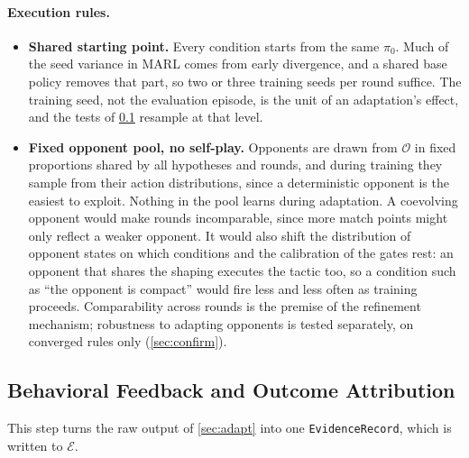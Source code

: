\documentclass[11pt]{article}
\newcommand{\Est}{\mathcal{E}}           %
\newcommand{\opp}{\mathcal{O}}           %
\newcommand{\code}[1]{\texttt{\small #1}}
\begin{document}
\paragraph{Execution rules.}
\begin{itemize}[leftmargin=*,itemsep=2pt]
  \item \textbf{Shared starting point.} Every condition starts from the same $\pi_0$.
    Much of the seed variance in MARL comes from early divergence, and a shared base policy removes that part, so two or three training seeds per round suffice.
    The training seed, not the evaluation episode, is the unit of an adaptation's effect, and the tests of \cref{sec:feedback} resample at that level.
  \item \textbf{Fixed opponent pool, no self-play.} Opponents are drawn from $\opp$ in fixed proportions shared by all hypotheses and rounds, and during training they sample from their action distributions, since a deterministic opponent is the easiest to exploit.
    Nothing in the pool learns during adaptation.
    A coevolving opponent would make rounds incomparable, since more match points might only reflect a weaker opponent.
    It would also shift the distribution of opponent states on which conditions and the calibration of the gates rest: an opponent that shares the shaping executes the tactic too, so a condition such as ``the opponent is compact'' would fire less and less often as training proceeds.
    Comparability across rounds is the premise of the refinement mechanism; robustness to adapting opponents is tested separately, on converged rules only (\cref{sec:confirm}).
\end{itemize}

\subsection{Behavioral Feedback and Outcome Attribution}
\label{sec:feedback}

This step turns the raw output of \cref{sec:adapt} into one \code{EvidenceRecord}, which is written to $\Est$.
\end{document}
